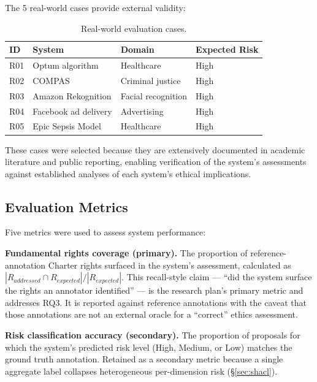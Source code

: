 The 5 real-world cases provide external validity:

\begin{table}[htbp]
\centering
\caption{Real-world evaluation cases.}
\label{tab:realworld}
\begin{tabular}{llll}
\toprule
\textbf{ID} & \textbf{System} & \textbf{Domain} & \textbf{Expected Risk} \\
\midrule
R01 & Optum algorithm \cite{optum2019} & Healthcare & High \\
R02 & COMPAS \cite{compas2016} & Criminal justice & High \\
R03 & Amazon Rekognition \cite{rekognition2019} & Facial recognition & High \\
R04 & Facebook ad delivery \cite{facebookads2019} & Advertising & High \\
R05 & Epic Sepsis Model \cite{wong2021sepsis} & Healthcare & High \\
\bottomrule
\end{tabular}
\end{table}

These cases were selected because they are extensively documented in academic literature and public reporting, enabling verification of the system's assessments against established analyses of each system's ethical implications.


\subsection{Evaluation Metrics}

Five metrics were used to assess system performance:

\textbf{Fundamental rights coverage (primary).} The proportion of reference-annotation Charter rights surfaced in the system's assessment, calculated as $|R_{addressed} \cap R_{expected}| / |R_{expected}|$. This recall-style claim --- ``did the system surface the rights an annotator identified'' --- is the research plan's primary metric and addresses RQ3. It is reported against reference annotations with the caveat that those annotations are not an external oracle for a ``correct'' ethics assessment.

\textbf{Risk classification accuracy (secondary).} The proportion of proposals for which the system's predicted risk level (High, Medium, or Low) matches the ground truth annotation. Retained as a secondary metric because a single aggregate label collapses heterogeneous per-dimension risk (\S\ref{sec:shacl}).

